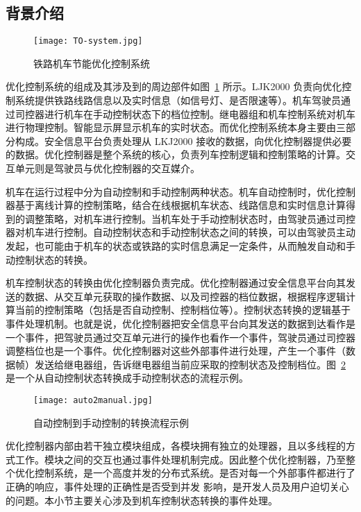\subsection{背景介绍}

\begin{figure}[ht]
\centering
\texttt{[image: TO-system.jpg]}
\caption{铁路机车节能优化控制系统}
\label{f:TO-system}
\end{figure}

优化控制系统的组成及其涉及到的周边部件如图~\ref{f:TO-system} 所示。LJK2000 负责向优化控制系统提供铁路线路信息以及实时信息（如信号灯、是否限速等）。机车驾驶员通过司控器进行机车在手动控制状态下的档位控制。继电器组和机车控制系统对机车进行物理控制。智能显示屏显示机车的实时状态。而优化控制系统本身主要由三部分构成。安全信息平台负责处理从 LKJ2000 接收的数据，向优化控制器提供必要的数据。优化控制器是整个系统的核心，负责列车控制逻辑和控制策略的计算。交互单元则是驾驶员与优化控制器的交互媒介。

机车在运行过程中分为自动控制和手动控制两种状态。机车自动控制时，优化控制器基于离线计算的控制策略，结合在线根据机车状态、线路信息和实时信息计算得到的调整策略，对机车进行控制。当机车处于手动控制状态时，由驾驶员通过司控器对机车进行控制。自动控制状态和手动控制状态之间的转换，可以由驾驶员主动发起，也可能由于机车的状态或铁路的实时信息满足一定条件，从而触发自动和手动控制状态的转换。

机车控制状态的转换由优化控制器负责完成。优化控制器通过安全信息平台向其发送的数据、从交互单元获取的操作数据、以及司控器的档位数据，根据程序逻辑计算当前的控制策略（包括是否自动控制、控制档位等）。控制状态转换的逻辑基于事件处理机制。也就是说，优化控制器把安全信息平台向其发送的数据到达看作是一个事件，把驾驶员通过交互单元进行的操作也看作一个事件，驾驶员通过司控器调整档位也是一个事件。优化控制器对这些外部事件进行处理，产生一个事件（数据帧）发送给继电器组，告诉继电器组当前应采取的控制状态及控制档位。图~\ref{f:auto2manual} 是一个从自动控制状态转换成手动控制状态的流程示例。

\begin{figure}[ht]
\centering
\texttt{[image: auto2manual.jpg]}
\caption{自动控制到手动控制的转换流程示例}
\label{f:auto2manual}
\end{figure}

优化控制器内部由若干独立模块组成，各模块拥有独立的处理器，且以多线程的方式工作。模块之间的交互也通过事件处理机制完成。因此整个优化控制器，乃至整个优化控制系统，是一个高度并发的分布式系统。是否对每一个外部事件都进行了正确的响应，事件处理的正确性是否受到并发 影响，是开发人员及用户迫切关心的问题。本小节主要关心涉及到机车控制状态转换的事件处理。


